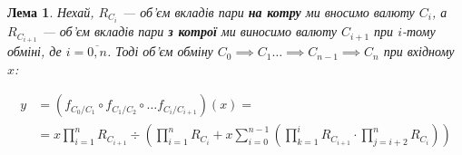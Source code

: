\documentclass[14pt]{extarticle}
\newtheorem{lemma}{Лема}
\begin{document}
\begin{lemma} Нехай, \(R_{C_{i}}\) --- об'єм вкладів пари \textbf{на котру} ми
  вносимо валюту \(C_i\), а \(R_{C_{i+1}}\) --- об'єм вкладів пари \textbf{з
	котрої} ми виносимо валюту \(C_{i+1}\) при \(i\)-тому обміні, де
  \(i = \overline{0, n}\). Тоді об'єм обміну
  \(C_{0} \implies C_{1} \ldots \implies C_{n-1} \implies C_{n} \) при вхідному
  \(x\):

  \begin{equation}\label{eq:nth-swap}
	\begin{aligned}
	  y &= (f_{C_{0}/C_{1}} \circ f_{C_{1}/C_{2}} \circ \ldots f_{C_{i}/C_{i+1}})(x) = \\
	  &= x \prod_{i=1}^n R_{C_{i+1}} \div \left( \prod_{i=1}^{n} R_{C_{i}} + x \sum_{i=0}^{n-1} \left( \prod_{k=1}^i R_{C_{i+1}} \cdot \prod_{j=i+2}^{n}  R_{C_{i}} \right) \right)
	\end{aligned}
	\end{equation}
\end{lemma}
\end{document}
